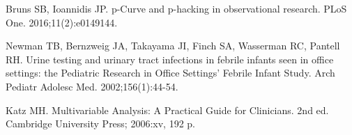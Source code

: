 \begin{references}
\item Bruns SB, Ioannidis JP. p-Curve and p-hacking in observational research. PLoS One. 2016;11(2):e0149144.
\item Newman TB, Bernzweig JA, Takayama JI, Finch SA, Wasserman RC, Pantell RH. Urine testing and urinary tract infections in febrile infants seen in office settings: the Pediatric Research in Office Settings’ Febrile Infant Study. Arch Pediatr Adolesc Med. 2002;156(1):44-54.
\item Katz MH. Multivariable Analysis: A Practical Guide for Clinicians. 2nd ed. Cambridge University Press; 2006:xv, 192 p.
\end{references}
\endgroup
